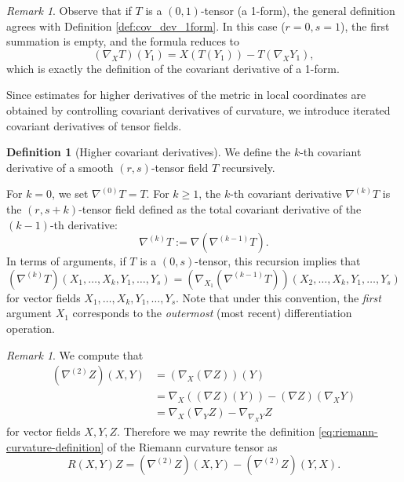 \documentclass[11pt]{article}
\theoremstyle{plain}
\theoremstyle{definition}
\newtheorem{definition}[theorem]{Definition}
\theoremstyle{remark}
\newtheorem{remark}[theorem]{Remark}
\begin{document}
\begin{remark}
    Observe that if $T$ is a $(0,1)$-tensor (a 1-form), the general definition agrees with Definition \ref{def:cov_dev_1form}. In this case ($r=0, s=1$), the first summation is empty, and the formula reduces to
    \begin{equation}
        (\nabla_X T)(Y_1) = X(T(Y_1)) - T(\nabla_X Y_1),
    \end{equation}
    which is exactly the definition of the covariant derivative of a 1-form.
\end{remark}

Since estimates for higher derivatives of the metric in local coordinates
are obtained by controlling covariant derivatives of curvature, we introduce
iterated covariant derivatives of tensor fields.

\begin{definition}[Higher covariant derivatives]
\label{def:high_order_cov_dev}
    We define the $k$-th covariant derivative of a smooth $(r,s)$-tensor field $T$ recursively.

    For $k=0$, we set $\nabla^{(0)} T = T$. For $k \geq 1$, the $k$-th covariant derivative $\nabla^{(k)} T$ is the $(r, s+k)$-tensor field defined as the total covariant derivative of the $(k-1)$-th derivative:
    \begin{equation}
        \nabla^{(k)} T := \nabla (\nabla^{(k-1)} T).
    \end{equation}
    In terms of arguments, if $T$ is a $(0,s)$-tensor, this recursion implies that
    \begin{equation}
        (\nabla^{(k)} T)(X_1, \dots, X_k, Y_1, \dots, Y_s) = (\nabla_{X_1} (\nabla^{(k-1)} T))(X_2, \dots, X_k, Y_1, \dots, Y_s)
    \end{equation}
    for vector fields $X_1, \dots, X_k, Y_1, \dots, Y_s$.
    Note that under this convention, the \emph{first} argument $X_1$ corresponds to the \emph{outermost} (most recent) differentiation operation.
\end{definition}

\begin{remark}
We compute that
\begin{align*}
    (\nabla^{(2)}Z)(X,Y) & = (\nabla_X (\nabla Z)) (Y) \\
    & = \nabla_X( (\nabla Z)(Y)) - (\nabla Z) (\nabla_X Y) \\
    & = \nabla_X(\nabla_Y Z) - \nabla_{\nabla_X Y} Z
\end{align*}
for vector fields $X,Y,Z$.
Therefore we may rewrite the definition
\eqref{eq:riemann-curvature-definition} of the Riemann curvature tensor as
\begin{equation}
    R(X,Y)Z = (\nabla^{(2)}Z)(X,Y) - (\nabla^{(2)}Z)(Y,X) .
\end{equation}
\end{remark}
\end{document}

